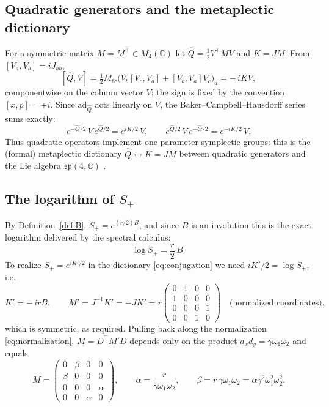 \documentclass[11pt]{article}
\theoremstyle{definition}
\theoremstyle{remark}
\newcommand{\C}{\mathbb{C}}
\newcommand{\w}{\omega}
\begin{document}
\subsection{Quadratic generators and the metaplectic dictionary}

For a symmetric matrix $M=M^{\top}\in M_4(\C)$ let
$\widehat Q=\tfrac12V^{\top}MV$ and $K=JM$.  From $[V_a,V_b]=iJ_{ab}$,
\begin{equation}\label{eq:commutator}
[\widehat Q,V]
=\tfrac12 M_{bc}\big(V_b[V_c,V_a]+[V_b,V_a]V_c\big)_{a}
=-\,iKV ,
\end{equation}
componentwise on the column vector $V$; the sign is fixed by the convention
$[x,p]=+i$.  Since $\mathrm{ad}_{\widehat Q}$ acts linearly on $V$, the
Baker--Campbell--Hausdorff series sums exactly:
\begin{equation}\label{eq:conjugation}
e^{-\widehat Q/2}\,V\,e^{\widehat Q/2}=e^{iK/2}\,V ,
\qquad
e^{\widehat Q/2}\,V\,e^{-\widehat Q/2}=e^{-iK/2}\,V .
\end{equation}
Thus quadratic operators implement one-parameter symplectic groups: this is
the (formal) metaplectic dictionary $\widehat Q\leftrightarrow K=JM$ between
quadratic generators and the Lie algebra $\mathfrak{sp}(4,\C)$
\cite{Folland}.

\subsection{The logarithm of $S_+$}

By Definition~\ref{def:B}, $S_+=e^{(r/2)B}$, and since $B$ is an involution
this is the exact logarithm delivered by the spectral calculus:
\begin{equation}
\log S_+=\frac r2\,B .
\end{equation}
To realize $S_+=e^{iK'/2}$ in the dictionary \eqref{eq:conjugation} we need
$iK'/2=\log S_+$, i.e.
\begin{equation}
K'=-\,irB,
\qquad
M'=J^{-1}K'=-JK'
=r\begin{pmatrix}0&1&0&0\\1&0&0&0\\0&0&0&1\\0&0&1&0\end{pmatrix}
\quad\text{(normalized coordinates)},
\end{equation}
which is symmetric, as required.  Pulling back along the normalization
\eqref{eq:normalization}, $M=D^{\top}M'D$ depends only on the product
$d_xd_y=\gamma\w_1\w_2$ and equals
\begin{equation}
M=\begin{pmatrix}
0&\beta&0&0\\ \beta&0&0&0\\ 0&0&0&\alpha\\ 0&0&\alpha&0
\end{pmatrix},
\qquad
\alpha=\frac{r}{\gamma\w_1\w_2},
\qquad
\beta=r\,\gamma\w_1\w_2=\alpha\gamma^2\w_1^2\w_2^2 .
\end{equation}
\end{document}
